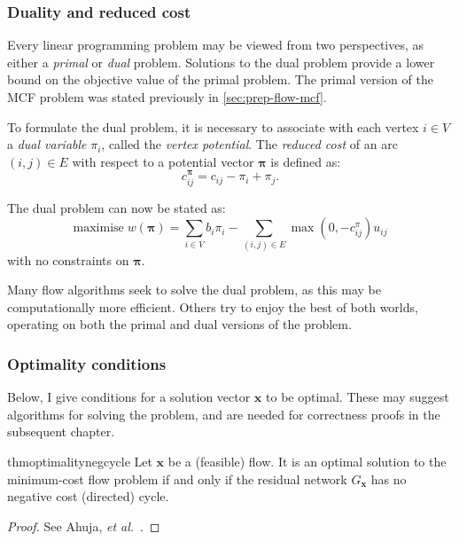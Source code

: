 \subsubsection{Duality and reduced cost} \label{sec:prep-flow-rc-and-dual}


Every linear programming problem may be viewed from two perspectives, as either a \emph{primal} or \emph{dual} problem. Solutions to the dual problem provide a lower bound on the objective value of the primal problem. The primal version of the MCF problem was stated previously in \cref{sec:prep-flow-mcf}. 

To formulate the dual problem, it is necessary to associate with each vertex $i \in V$ a \emph{dual variable} $\pi_i$, called the \emph{vertex potential}. The \emph{reduced cost} of an arc $(i,j)\in E$ with respect to a potential vector $\boldsymbol{\pi}$ is defined as:
\begin{equation} \label{eq:reduced-costs}
c_{ij}^{\boldsymbol{\pi}}=c_{ij}-\pi_{i}+\pi_{j}.
\end{equation}

The dual problem can now be stated as:
\begin{equation}
\mathrm{maximise}\; w(\boldsymbol{\pi})=\sum_{i\in V}b_{i}\pi_{i}-\sum_{(i,j)\in E}\max\left(0,-c_{ij}^{\pi}\right)u_{ij}
\end{equation}
with no constraints on $\boldsymbol{\pi}$.

Many flow algorithms seek to solve the dual problem, as this may be computationally more efficient. Others try to enjoy the best of both worlds, operating on both the primal and dual versions of the problem.

\subsubsection{Optimality conditions} \label{sec:prep-flow-optimality}


Below, I give conditions for a solution vector $\mathbf{x}$ to be optimal. These may suggest algorithms for solving the problem, and are needed for correctness proofs in the subsequent chapter. \\

\begin{restatable}{thm}{optimalitynegcycle}
\label{thm:optimality-neg-cycle}
Let $\mathbf{x}$ be a (feasible) flow. It is an optimal solution to the minimum-cost flow problem if and only if the residual network $G_\mathbf{x}$ has no negative cost (directed) cycle.
\end{restatable}
\begin{proof}
See Ahuja, \textit{et al.}~\cite[p.~307]{Ahuja:1993}.
\end{proof}

